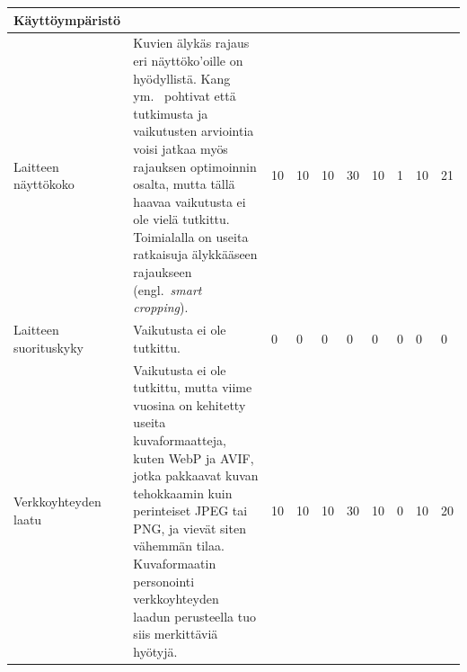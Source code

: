 \documentclass[finnish, 12pt, a4paper, elec, utf8, a-1b]{aaltothesis}
\begin{document}
{\begin{longtable}{p{2.5cm}|p{6cm}|p{0.5cm}p{0.5cm}p{0.5cm}|p{0.5cm}|p{0.5cm}p{0.5cm}p{0.5cm}|p{0.5cm}|}
    \midrule
    \textbf{Käyttöympäristö}                                                                                                                                                                                                                                                                                                                                                                                                                                                                                                                                                                                                                                                                                                                           \\
    \midrule
    Laitteen näyttökoko                    & Kuvien älykäs rajaus eri näyttöko'oille on hyödyllistä. Kang ym.~\cite{5539850} pohtivat että tutkimusta ja vaikutusten arviointia voisi jatkaa myös rajauksen optimoinnin osalta, mutta tällä haavaa vaikutusta ei ole vielä tutkittu. Toimialalla on useita ratkaisuja älykkääseen rajaukseen (engl.~\textit{smart cropping}).                                      & 10                                         & 10                                  & 10                                     & 30                           & 10                                              & 1                                         & 10                                        & 21                           \\
    \midrule
    Laitteen suorituskyky                  & Vaikutusta ei ole tutkittu.                                                                                                                                                                                                                                                                                                                                           & 0                                          & 0                                   & 0                                      & 0                            & 0                                               & 0                                         & 0                                         & 0                            \\
    \midrule
    Verkkoyhteyden laatu                   & Vaikutusta ei ole tutkittu, mutta viime vuosina on kehitetty useita kuvaformaatteja, kuten WebP ja AVIF, jotka pakkaavat kuvan tehokkaamin kuin perinteiset JPEG tai PNG, ja vievät siten vähemmän tilaa. Kuvaformaatin personointi verkkoyhteyden laadun perusteella tuo siis merkittäviä hyötyjä.                                                                   & 10                                         & 10                                  & 10                                     & 30                           & 10                                              & 0                                         & 10                                        & 20                           \\

\end{longtable}}
\end{document}

